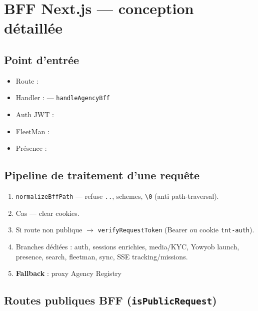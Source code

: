 \chapter{BFF Next.js --- conception détaillée}

\section{Point d'entrée}

\begin{itemize}
  \item Route : 
  \item Handler :  --- \texttt{handleAgencyBff}
  \item Auth JWT : 
  \item FleetMan : 
  \item Présence : 
\end{itemize}

\section{Pipeline de traitement d'une requête}

\begin{enumerate}
  \item \texttt{normalizeBffPath} --- refuse \texttt{..}, schemes, \texttt{\textbackslash 0}
        (anti path-traversal).
  \item Cas  --- clear cookies.
  \item Si route non publique $\rightarrow$ \texttt{verifyRequestToken}
        (Bearer ou cookie \texttt{tnt-auth}).
  \item Branches dédiées : auth, sessions enrichies, media/KYC, Yowyob launch,
        presence, search, fleetman, sync, SSE tracking/missions.
  \item \textbf{Fallback} : proxy Agency Registry \\
\end{enumerate}

\section{Routes publiques BFF (\texttt{isPublicRequest})}

